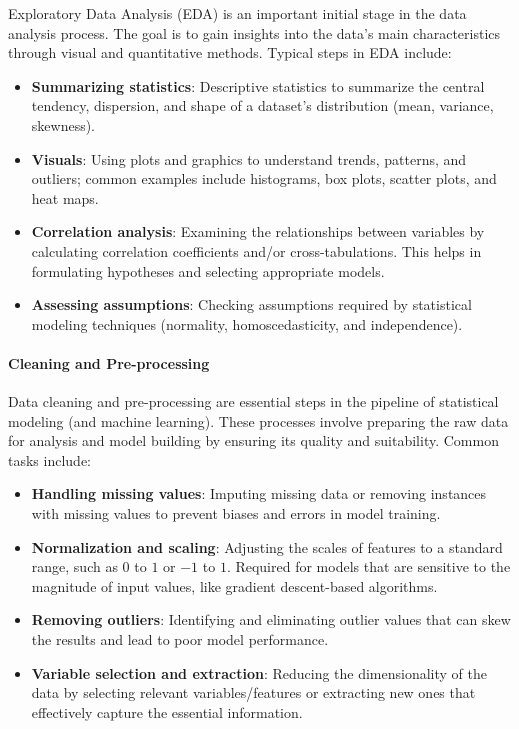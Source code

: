 \documentclass[12pt, twoside,hidelinks]{article}
\theoremstyle{definition}
\numberwithin{equation}{section}
\begin{document}
Exploratory Data Analysis (EDA) is an important initial stage in the data analysis process. The goal is to gain insights into the data's main characteristics through visual and quantitative methods. Typical steps in EDA include:
\begin{itemize}
    \item \textbf{Summarizing statistics}: Descriptive statistics to summarize the central tendency, dispersion, and shape of a dataset's distribution (mean, variance, skewness).
    \item \textbf{Visuals}: Using plots and graphics to understand trends, patterns, and outliers; common examples include histograms, box plots, scatter plots, and heat maps.
    \item \textbf{Correlation analysis}: Examining the relationships between variables by calculating correlation coefficients and/or cross-tabulations. This helps in formulating hypotheses and selecting appropriate models.
    \item \textbf{Assessing assumptions}: Checking assumptions required by statistical modeling techniques (normality, homoscedasticity, and independence).
\end{itemize}


\paragraph{Cleaning and Pre-processing}

Data cleaning and pre-processing are essential steps in the pipeline of statistical modeling (and machine learning). These processes involve preparing the raw data for analysis and model building by ensuring its quality and suitability. Common tasks include:
\begin{itemize}
    \item \textbf{Handling missing values}: Imputing missing data or removing instances with missing values to prevent biases and errors in model training.
    \item \textbf{Normalization and scaling}: Adjusting the scales of features to a standard range, such as \(0\) to \(1\) or \(-1\) to \(1\). Required for models that are sensitive to the magnitude of input values, like gradient descent-based algorithms.
    \item \textbf{Removing outliers}: Identifying and eliminating outlier values that can skew the results and lead to poor model performance.
    \item \textbf{Variable selection and extraction}: Reducing the dimensionality of the data by selecting relevant variables/features or extracting new ones that effectively capture the essential information.
\end{itemize}
\end{document}
